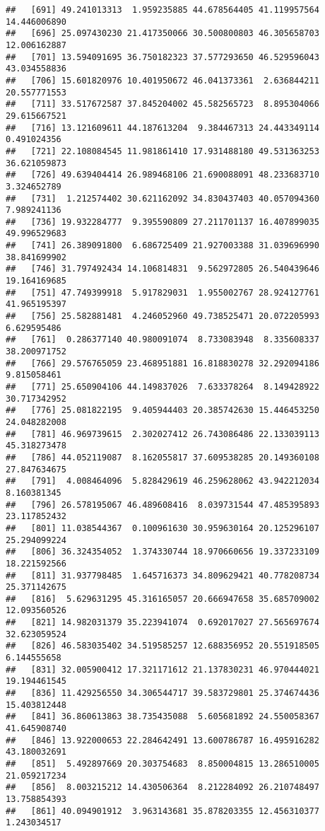 \documentclass[
]{article}
\begin{document}
\begin{verbatim}
##   [691] 49.241013313  1.959235885 44.678564405 41.119957564 14.446006890
##   [696] 25.097430230 21.417350066 30.500800803 46.305658703 12.006162887
##   [701] 13.594091695 36.750182323 37.577293650 46.529596043 43.034558836
##   [706] 15.601820976 10.401950672 46.041373361  2.636844211 20.557771553
##   [711] 33.517672587 37.845204002 45.582565723  8.895304066 29.615667521
##   [716] 13.121609611 44.187613204  9.384467313 24.443349114  0.491024356
##   [721] 22.108084545 11.981861410 17.931488180 49.531363253 36.621059873
##   [726] 49.639404414 26.989468106 21.690088091 48.233683710  3.324652789
##   [731]  1.212574402 30.621162092 34.830437403 40.057094360  7.989241136
##   [736] 19.932284777  9.395590809 27.211701137 16.407899035 49.996529683
##   [741] 26.389091800  6.686725409 21.927003388 31.039696990 38.841699902
##   [746] 31.797492434 14.106814831  9.562972805 26.540439646 19.164169685
##   [751] 47.749399918  5.917829031  1.955002767 28.924127761 41.965195397
##   [756] 25.582881481  4.246052960 49.738525471 20.072205993  6.629595486
##   [761]  0.286377140 40.980091074  8.733083948  8.335608337 38.200971752
##   [766] 29.576765059 23.468951881 16.818830278 32.292094186  9.815058461
##   [771] 25.650904106 44.149837026  7.633378264  8.149428922 30.717342952
##   [776] 25.081822195  9.405944403 20.385742630 15.446453250 24.048282008
##   [781] 46.969739615  2.302027412 26.743086486 22.133039113 45.318273478
##   [786] 44.052119087  8.162055817 37.609538285 20.149360108 27.847634675
##   [791]  4.008464096  5.828429619 46.259628062 43.942212034  8.160381345
##   [796] 26.578195067 46.489608416  8.039731544 47.485395893 23.117852432
##   [801] 11.038544367  0.100961630 30.959630164 20.125296107 25.294099224
##   [806] 36.324354052  1.374330744 18.970660656 19.337233109 18.221592566
##   [811] 31.937798485  1.645716373 34.809629421 40.778208734 25.371142675
##   [816]  5.629631295 45.316165057 20.666947658 35.685709002 12.093560526
##   [821] 14.982031379 35.223941074  0.692017027 27.565697674 32.623059524
##   [826] 46.583035402 34.519585257 12.688356952 20.551918505  6.144555658
##   [831] 32.005900412 17.321171612 21.137830231 46.970444021 19.194461545
##   [836] 11.429256550 34.306544717 39.583729801 25.374674436 15.403812448
##   [841] 36.860613863 38.735435088  5.605681892 24.550058367 41.645908740
##   [846] 13.922000653 22.284642491 13.600786787 16.495916282 43.180032691
##   [851]  5.492897669 20.303754683  8.850004815 13.286510005 21.059217234
##   [856]  8.003215212 14.430506364  8.212284092 26.210748497 13.758854393
##   [861] 40.094901912  3.963143681 35.878203355 12.456310377  1.243034517

\end{verbatim}
\end{document}
